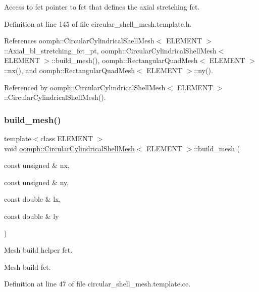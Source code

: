 Access to fct pointer to fct that defines the axial stretching fct. 



Definition at line 145 of file circular\+\_\+shell\+\_\+mesh.\+template.\+h.



References oomph\+::\+Circular\+Cylindrical\+Shell\+Mesh$<$ E\+L\+E\+M\+E\+N\+T $>$\+::\+Axial\+\_\+bl\+\_\+stretching\+\_\+fct\+\_\+pt, oomph\+::\+Circular\+Cylindrical\+Shell\+Mesh$<$ E\+L\+E\+M\+E\+N\+T $>$\+::build\+\_\+mesh(), oomph\+::\+Rectangular\+Quad\+Mesh$<$ E\+L\+E\+M\+E\+N\+T $>$\+::nx(), and oomph\+::\+Rectangular\+Quad\+Mesh$<$ E\+L\+E\+M\+E\+N\+T $>$\+::ny().



Referenced by oomph\+::\+Circular\+Cylindrical\+Shell\+Mesh$<$ E\+L\+E\+M\+E\+N\+T $>$\+::\+Circular\+Cylindrical\+Shell\+Mesh().

\mbox{\label{classoomph_1_1CircularCylindricalShellMesh_a032ddb9b1afa4ef446ca74c8a6965000}} 
\subsubsection{\texorpdfstring{build\+\_\+mesh()}{build\_mesh()}}
{\footnotesize\ttfamily template$<$class E\+L\+E\+M\+E\+NT $>$ \\
void \hyperlink{classoomph_1_1CircularCylindricalShellMesh}{oomph\+::\+Circular\+Cylindrical\+Shell\+Mesh}$<$ E\+L\+E\+M\+E\+NT $>$\+::build\+\_\+mesh (\begin{DoxyParamCaption}\item[{const unsigned \&}]{nx,  }\item[{const unsigned \&}]{ny,  }\item[{const double \&}]{lx,  }\item[{const double \&}]{ly }\end{DoxyParamCaption})\hspace{0.3cm}{\ttfamily [private]}}



Mesh build helper fct. 

Mesh build fct. 

Definition at line 47 of file circular\+\_\+shell\+\_\+mesh.\+template.\+cc.




